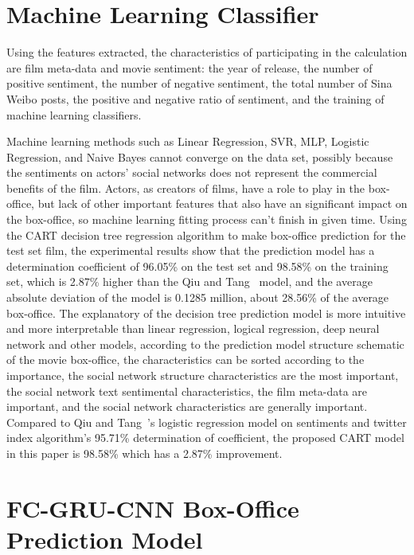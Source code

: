\documentclass[review]{cvpr}
\begin{document}
\section{Machine Learning Classifier}

Using the features extracted, the characteristics of participating in the calculation are film meta-data and movie sentiment:
the year of release, the number of positive sentiment, the number of negative sentiment, the total number of Sina Weibo posts,
the positive and negative ratio of sentiment, and the training of machine learning classifiers.

Machine learning methods such as Linear Regression, SVR, MLP, Logistic Regression, and Naive Bayes cannot converge on the data set,
possibly because the sentiments on actors' social networks does not represent the commercial benefits of the film.
Actors, as creators of films, have a role to play in the box-office, but lack of other important features that also have an significant impact on the box-office,
so machine learning fitting process can't finish in given time.
Using the CART decision tree regression algorithm to make box-office prediction for the test set film, 
the experimental results show that the prediction model has a determination coefficient of 96.05\% on the test set and 98.58\% on the training set, which is 2.87\% higher than the Qiu and Tang~\cite{qiu2018microblog} model,
and the average absolute deviation of the model is 0.1285 million, about 28.56\% of the average box-office.
The explanatory of the decision tree prediction model is more intuitive and more interpretable than linear regression, logical regression, deep neural network and other models,
according to the prediction model structure schematic of the movie box-office,
the characteristics can be sorted according to the importance, the social network structure characteristics are the most important,
the social network text sentimental characteristics, the film meta-data are important, and the social network characteristics are generally important.
Compared to Qiu and Tang~\cite{qiu2018microblog}'s logistic regression model on sentiments and twitter index algorithm's 95.71\% determination of coefficient,
the proposed CART model in this paper is 98.58\% which has a 2.87\% improvement.

\section{FC-GRU-CNN Box-Office Prediction Model}
\end{document}
